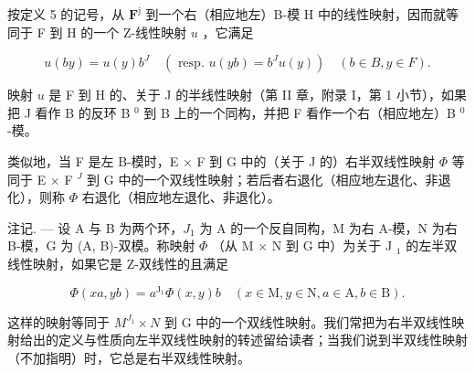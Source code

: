 按定义 5 的记号，从 \(\mathbf{F}^{\mathrm{j}}\) 到一个右（相应地左）B-模 H 中的线性映射，因而就等同于 F 到 H 的一个 Z-线性映射 \(u\) ，它满足

\[
u (b y) = u (y) b ^ {J} \quad (\text { resp. } u (y b) = b ^ {J} u (y)) \quad (b \in B, y \in F).
\]

映射 \(u\) 是 F 到 H 的、关于 J 的半线性映射（第 II 章，附录 I，第 1 小节），如果把 J 看作 B 的反环 B \(^{0}\) 到 B 上的一个同构，并把 F 看作一个右（相应地左）B \(^{0}\) -模。

类似地，当 F 是左 B-模时，E × F 到 G 中的（关于 J 的）右半双线性映射 \(\Phi\) 等同于 E × F \(^{J}\) 到 G 中的一个双线性映射；若后者右退化（相应地左退化、非退化），则称 \(\Phi\) 右退化（相应地左退化、非退化）。

注记. --- 设 A 与 B 为两个环，\(J_{1}\) 为 A 的一个反自同构，M 为右 A-模，N 为右 B-模，G 为 (A, B)-双模。称映射 \(\Phi\) （从 M \(\times\) N 到 G 中）为关于 J \(_{1}\) 的左半双线性映射，如果它是 Z-双线性的且满足

\[
\Phi (x a, y b) = a ^ {\mathrm{J} _ {1}} \Phi (x, y) b \quad (x \in \mathrm{M}, y \in \mathrm{N}, a \in \mathrm{A}, b \in \mathrm{B}).\tag{9}
\]

这样的映射等同于 \(M^{J_{1}} \times N\) 到 G 中的一个双线性映射。我们常把为右半双线性映射给出的定义与性质向左半双线性映射的转述留给读者；当我们说到半双线性映射（不加指明）时，它总是右半双线性映射。

